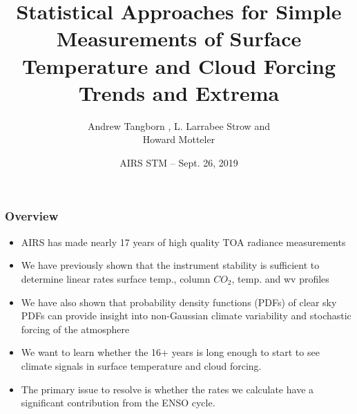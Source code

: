\documentclass[10pt,t]{beamer}
\title{Statistical Approaches for Simple Measurements of  Surface Temperature and
Cloud Forcing Trends and Extrema}
\author{Andrew Tangborn , L. Larrabee Strow and \\ Howard Motteler }
\institute{Joint Center for Earth Systems Technology and \\ UMBC Department of Physics}
\date{AIRS STM  -- Sept. 26, 2019}
\begin{document}
\frame{\maketitle}
\begin{frame}
  \frametitle{Overview}
    \begin{itemize}
    \item AIRS has made nearly 17 years of high quality TOA radiance measurements 
    \item We have previously shown that the instrument stability is sufficient to determine linear rates surface temp., column $CO_2$, temp. and wv profiles  
    \item We have also shown that probability density functions (PDFs) of clear sky PDFs can provide insight into non-Gaussian climate variability and stochastic forcing of the atmosphere 
    \item We want to learn whether the 16+ years is long enough to start to see climate signals in surface temperature and cloud forcing.   
    \item The primary issue to resolve is whether the rates we calculate have a significant contribution from the ENSO cycle.  
    \end{itemize}
\end{frame}
\end{document}
